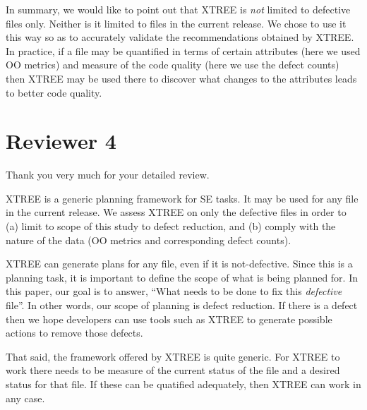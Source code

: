 In summary, we would like to point out that XTREE is \textit{not} limited to defective files only. Neither is it limited to files in the current release. We chose to use it this way so as to accurately validate the recommendations obtained by XTREE. In practice, if a file may be quantified in terms of certain attributes (here we used OO metrics) and measure of the code quality (here we use the defect counts) then XTREE may be used there to discover what changes to the attributes leads to better code quality.  

\section*{Reviewer 4}

Thank you very much for your detailed review. 


XTREE is a generic planning framework for SE tasks. It may be used for any file in the current release. We assess XTREE on only the defective files in order to (a) limit to scope of this study to defect reduction, and (b) comply with the nature of the data (OO metrics and corresponding defect counts). 

XTREE can generate plans for any file, even if it is not-defective. Since this is a planning task, it is important to define the scope of what is being planned for. In this paper, our goal is to answer, ``What needs to be done to fix this \textit{defective} file''. In other words, our scope of planning is defect reduction. If there is a defect then we hope developers can use tools such as XTREE to generate possible actions to remove those defects. 

That said, the framework offered by XTREE is quite generic. For XTREE to work there needs to be measure of the current status of the file and a desired status for that file. If these can be quatified adequately, then XTREE can work in any case. 

